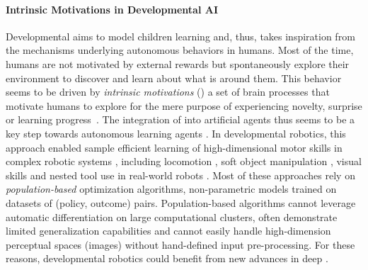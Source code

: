 \paragraph{Intrinsic Motivations in Developmental AI}

 Developmental \ai aims to model children learning and, thus, takes inspiration from the mechanisms underlying autonomous behaviors in humans. Most of the time, humans are not motivated by external rewards but spontaneously explore their environment to discover and learn about what is around them. This behavior seems to be driven by \textit{intrinsic motivations} (\ims) a set of brain processes that motivate humans to explore for the mere purpose of experiencing novelty, surprise or learning progress~\citep{berlyne1966curiosity,gopnik1999scientist,kidd2015psychology,oudeyer2016evolution,gottlieb2018towards}. The integration of \ims into artificial agents thus seems to be a key step towards autonomous learning agents \citep{schmidhuber1991possibility,kaplan2007search}. In developmental robotics, this approach enabled sample efficient learning of high-dimensional motor skills in complex robotic systems \citep{santucci2020intrinsically}, including locomotion \citep{baranes2013active,martius2013information}, soft object manipulation \citep{rolf2013efficient,nguyen2014socially}, visual skills \citep{lonini2013robust} and nested tool use in real-world robots \citep{imgep}. Most of these approaches rely on \textit{population-based} optimization algorithms, non-parametric models trained on datasets of (policy, outcome) pairs. Population-based algorithms cannot leverage automatic differentiation on large computational clusters, often demonstrate limited generalization capabilities and cannot easily handle high-dimension perceptual spaces (\eg images) without hand-defined input pre-processing. For these reasons, developmental robotics could benefit from new advances in deep \rl.

